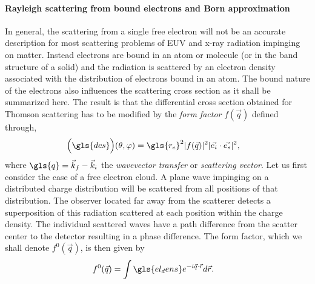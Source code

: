 \paragraph{Rayleigh scattering from bound electrons and Born approximation}
In general, the scattering from a single free electron will not be an accurate description for most scattering problems of EUV and x-ray radiation impinging on matter. Instead electrons are bound in an atom or molecule (or in the band structure of a solid) and the radiation is scattered by an electron density associated with the distribution of electrons bound in an atom. The bound nature of the electrons also influences the scattering cross section as it shall be summarized here. The result is that the differential cross section obtained for Thomson scattering has to be modified by the \emph{form factor} $f(\vec{q})$ defined through,
\begin{align}
\Big(\gls{dcs}\Big)(\theta, \varphi) &= \gls{r_e}^2 |f(\vec{q})|^2 |\vec{e_i} \cdot \vec{e_s}|^2 \text{,} \label{ch_theo:eqn_atomic_form_factor}
\end{align}
where $\gls{q} = \vec{k}_f - \vec{k}_{i}$ the \emph{wavevector transfer} or \emph{scattering vector}. Let us first consider the case of a free electron cloud. A plane wave impinging on a distributed charge distribution will be scattered from all positions of that distribution. The observer located far away from the scatterer detects a superposition of this radiation scattered at each position within the charge density. The individual scattered waves have a path difference from the scatter center to the detector resulting in a phase difference. The form factor, which we shall denote $f^{0}(\vec{q})$, is then given by
\begin{align}
f^0(\vec{q}) &= \int \gls{el_dens} e^{- i \vec{q} \cdot \vec{r}} d \vec{r} \text{.} \label{ch_theo:eqn_atomic_form_factor_free}
\end{align}
